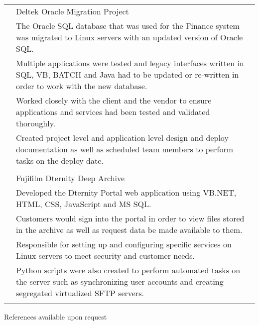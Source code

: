 \documentclass[12pt]{article}
\begin{document}
\begin{tabular}{p{2.3cm}|p{15.4cm}}
	\centering 2016 & Deltek Oracle Migration Project\\&\small{The Oracle SQL database that was used for the Finance system was migrated to Linux servers with an updated version of Oracle SQL.}\\&\small{Multiple applications were tested and legacy interfaces written in SQL, VB, BATCH and Java had to be updated or re-written in order to work with the new database.}\\&\small{Worked closely with the client and the vendor to ensure applications and services had been tested and validated thoroughly.}\\&\small{Created project level and application level design and deploy documentation as well as scheduled team members to perform tasks on the deploy date.}\\\multicolumn{2}{c}{} \\
	\centering 2015 & Fujifilm Dternity Deep Archive\\&\small{Developed the Dternity Portal web application using VB.NET, HTML, CSS, JavaScript and MS SQL.}\\&\small{Customers would sign into the portal in order to view files stored in the archive as well as request data be made available to them.}\\&\small{Responsible for setting up and configuring specific services on Linux servers to meet security and customer needs.}\\&\small{Python scripts were also created to perform automated tasks on the server such as synchronizing user accounts and creating segregated virtualized SFTP servers.}\\\multicolumn{2}{c}{} \\
\end{tabular}

\centering References available upon request
\end{document}
